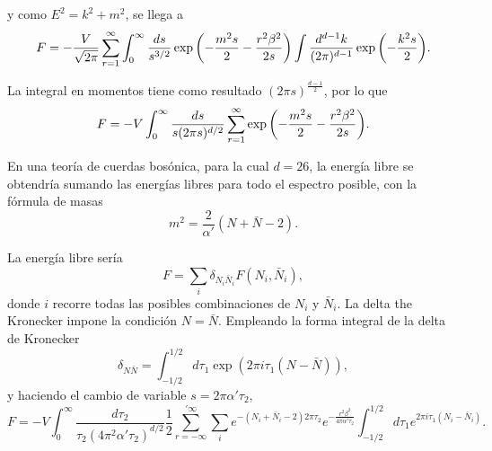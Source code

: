 y como $E^2=k^2+m^2$, se llega a 
\begin{equation}
  F=-\frac{V}{\sqrt{2\pi}}\sum^\infty_{r=1} \int_0^\infty \frac{ds}{s^{3/2}} \exp \qty(-\frac{m^2s}{2} -\frac{r^2\beta^2}{2s})
  \int \frac{d^{d-1}k}{(2\pi)^{d-1}}\exp\qty(-\frac{k^2s}{2}).
\end{equation}

La integral en momentos tiene como resultado $(2\pi s)^{\frac{d-1}{2}}$, por lo que
\begin{equation}
  F=-V \int_0^\infty \frac{ds}{s(2\pi s)^{d/2}}\sum^\infty_{r=1} \exp \qty(-\frac{m^2s}{2}- \frac{r^2\beta^2}{2s}).
\end{equation}



En una teoría de cuerdas bosónica, para la cual $d=26$, la energía libre se obtendría sumando las
energías libres para todo el espectro posible, con la fórmula de masas
\begin{equation}
  m^2=\frac{2}{\alpha'}(N+\bar N-2).
\end{equation}

La energía libre sería
\begin{equation}
  F=\sum_i \delta_{N_i \bar N_i} F(N_i,\bar N_i),
\end{equation}
donde $i$ recorre todas las posibles combinaciones de $N_i$ y $\bar N_i$.
La delta the Kronecker impone la condición $N=\bar N$. 
Empleando la forma integral de la delta de Kronecker
\begin{equation}
   \delta_{N\bar N}=\int_{-1/2}^{1/2}d\tau_1 \exp(2\pi i\tau_1 (N-\bar N)),
\end{equation}
y haciendo el cambio de variable $s=2\pi\alpha'\tau_2$,
\begin{equation}
  F=-V \int_0^\infty \frac{d\tau_2}{\tau_2(4\pi^2\alpha'\tau_2)^{d/2}}\frac 1 2\sum_{r=-\infty}^{'\infty} 
  \sum_i e^{-(N_i+\bar N_i -2)2\pi\tau_2} e^{-\frac{r^2\beta^2}{4\pi\alpha'\tau_2}}\int_{-1/2}^{1/2} d\tau_1 e^{2\pi i\tau_1(N_i-\bar N_i)}.
\end{equation}

